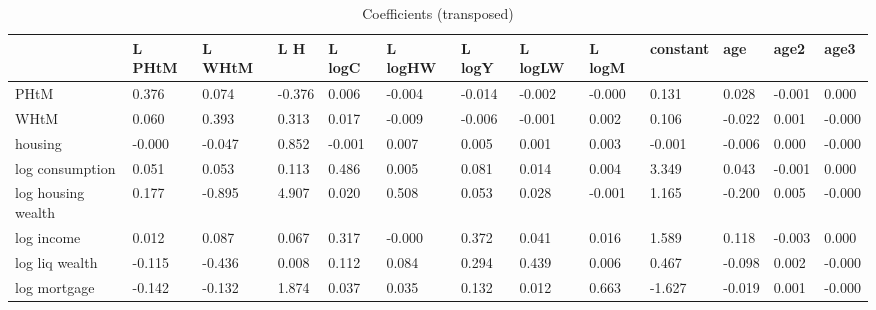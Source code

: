 \begin{table}[htbp]
\caption{\label{clabel} Coefficients (transposed)}\centering\medskip
\begin{tabular}{lllllllllllll} \hline \hline
 & L PHtM  & L WHtM  & L H  & L logC  & L logHW  & L logY  & L logLW  & L logM  & constant  & age  & age2  & age3  \\  \hline 
PHtM &     0.376 &     0.074 &    -0.376 &     0.006 &    -0.004 &    -0.014 &    -0.002 &    -0.000 &     0.131 &     0.028 &    -0.001 &     0.000 \\  
WHtM &     0.060 &     0.393 &     0.313 &     0.017 &    -0.009 &    -0.006 &    -0.001 &     0.002 &     0.106 &    -0.022 &     0.001 &    -0.000 \\  
housing &    -0.000 &    -0.047 &     0.852 &    -0.001 &     0.007 &     0.005 &     0.001 &     0.003 &    -0.001 &    -0.006 &     0.000 &    -0.000 \\  
log consumption &     0.051 &     0.053 &     0.113 &     0.486 &     0.005 &     0.081 &     0.014 &     0.004 &     3.349 &     0.043 &    -0.001 &     0.000 \\  
log housing wealth &     0.177 &    -0.895 &     4.907 &     0.020 &     0.508 &     0.053 &     0.028 &    -0.001 &     1.165 &    -0.200 &     0.005 &    -0.000 \\  
log income &     0.012 &     0.087 &     0.067 &     0.317 &    -0.000 &     0.372 &     0.041 &     0.016 &     1.589 &     0.118 &    -0.003 &     0.000 \\  
log liq wealth &    -0.115 &    -0.436 &     0.008 &     0.112 &     0.084 &     0.294 &     0.439 &     0.006 &     0.467 &    -0.098 &     0.002 &    -0.000 \\  
log mortgage &    -0.142 &    -0.132 &     1.874 &     0.037 &     0.035 &     0.132 &     0.012 &     0.663 &    -1.627 &    -0.019 &     0.001 &    -0.000 \\  
\hline \hline \end{tabular}
\end{table}
